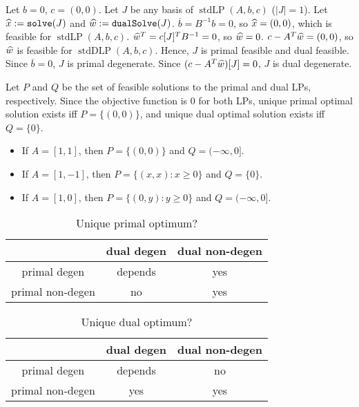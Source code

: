 \documentclass[a4paper, 12pt, fleqn]{article}
\newcommand*{\bline}{\overline{b}}
\DeclareMathOperator{\stdLP}{stdLP}
\DeclareMathOperator{\stdDLP}{stdDLP}
\DeclareMathOperator{\solve}{\mathtt{solve}}
\DeclareMathOperator{\dualSolve}{\mathtt{dualSolve}}
\begin{document}
\begin{example}
Let $b = 0$, $c = (0, 0)$. Let $J$ be any basis of $\stdLP(A, b, c)$ ($|J| = 1$).
Let $\xhat \defeq \solve(J)$ and $\what \defeq \dualSolve(J)$.
$\bline = B^{-1}b = 0$, so $\widehat{x} = (0, 0)$, which is feasible for $\stdLP(A, b, c)$.
$\widehat{w}^T = c[J]^TB^{-1} = 0$, so $\widehat{w} = 0$.
$c - A^T\widehat{w} = (0, 0)$, so $\widehat{w}$ is feasible for $\stdDLP(A, b, c)$.
Hence, $J$ is primal feasible and dual feasible.
Since $\bline = 0$, $J$ is primal degenerate.
Since $(c - A^T\widehat{w})[J] = 0$, $J$ is dual degenerate.

Let $P$ and $Q$ be the set of feasible solutions to the primal and dual LPs, respectively.
Since the objective function is 0 for both LPs,
unique primal optimal solution exists iff $P = \{(0, 0)\}$,
and unique dual optimal solution exists iff $Q = \{0\}$.
\begin{itemize}
\item If $A = [1, 1]$, then $P = \{(0, 0)\}$ and $Q = (-\infty, 0]$.
\item If $A = [1, -1]$, then $P = \{(x, x): x \ge 0\}$ and $Q = \{0\}$.
\item If $A = [1, 0]$, then $P = \{(0, y): y \ge 0\}$ and $Q = (-\infty, 0]$.
\end{itemize}
\end{example}

\begin{table}[ht]
\centering
\caption{Unique primal optimum?}
\label{table:upo-degen}
\begin{tabular}{|c|c|c|}
\hline & dual degen & dual non-degen
\\ \hline primal degen & depends & yes
\\ \hline primal non-degen & no & yes
\\ \hline
\end{tabular}
\end{table}

\begin{table}[ht]
\centering
\caption{Unique dual optimum?}
\label{table:udo-degen}
\begin{tabular}{|c|c|c|}
\hline & dual degen & dual non-degen
\\ \hline primal degen & depends & no
\\ \hline primal non-degen & yes & yes
\\ \hline
\end{tabular}
\end{table}
\end{document}

